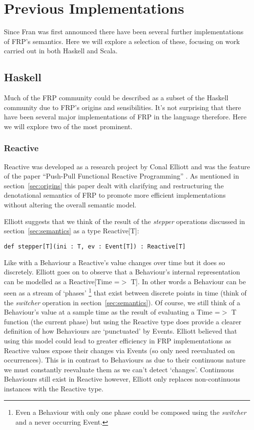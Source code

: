 \chapter{Previous Implementations}
  Since Fran was first announced there have been several further implementations of FRP's semantics. Here
  we will explore a selection of these, focusing on work carried out in both Haskell and Scala.
  
  \section{Haskell}
    Much of the FRP community could be described as a subset of the Haskell community due to FRP's
    origins and sensibilities. It's not surprising that there have been several major implementations
    of FRP in the language therefore. Here we will explore two of the most prominent.
    
    \subsection{Reactive}
      Reactive was developed as a research project by Conal Elliott and was the feature
      of the paper ``Push-Pull Functional Reactive Programming'' \cite{Elliott2009}. As mentioned
      in section~\ref{sec:origins} this paper dealt with clarifying and restructuring the denotational
      semantics of FRP
      to promote more efficient implementations without altering the overall semantic model.
      
      Elliott suggests that we think of the result of the \emph{stepper} operations discussed in
      section~\ref{sec:semantics} as a type Reactive[T]:
      
\begin{verbatim}
def stepper[T](ini : T, ev : Event[T]) : Reactive[T]
\end{verbatim}

      Like with a Behaviour a Reactive's value changes over time but it does so discretely. 
      Elliott goes on to observe that 
      a Behaviour's internal representation can be modelled as a Reactive[Time =$>$ T]. In other words a 
      Behaviour can be seen as a stream of `phases' \footnote{Even a Behaviour with only one phase could be composed using the \emph{switcher} and a never occurring Event.} that exist between discrete
      points in time (think of the \emph{switcher} operation in section~\ref{sec:semantics}). Of course, we
      still think of a Behaviour's value at a sample time as the result of evaluating a
      Time =$>$ T function (the current phase) but using the Reactive type
      does provide a clearer definition of how Behaviours are `punctuated' by Events. Elliott believed
      that using this model could lead to greater efficiency in FRP implementations as Reactive values
      expose their changes via Events (so only need reevaluated on occurrences). This is
      in contrast to Behaviours as due to their continuous nature we must constantly reevaluate them
      as we can't detect `changes'. Continuous Behaviours still exist in Reactive however, Elliott only replaces     
      non-continuous instances with the Reactive type.
      
